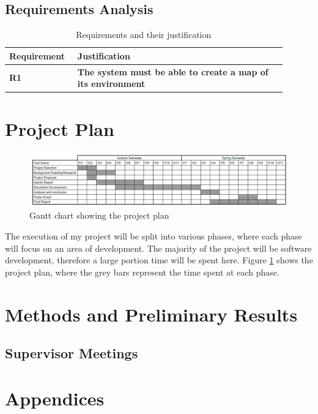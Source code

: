 \documentclass[12pt]{article}
\begin{document}
\subsection{Requirements Analysis}
\begin{table}[H]
    \centering
    \begin{tabular}{|p{0.2\linewidth}|p{0.7\linewidth}|}
        \hline
        \textbf{Requirement} & \textbf{Justification}\\
        \hline
        \textbf{R1} & \textbf{The system must be able to create a map of its environment}\\
        \hline
    \end{tabular}
    \caption{Requirements and their justification}\label{tab:table}
\end{table}


\section{Project Plan}
\begin{figure}[H]
    \centering
    \includegraphics[width=0.8\linewidth]{gantt_chart.png}
    \caption{Gantt chart showing the project plan}
    \label{fig:gantt_chart}
\end{figure}
The execution of my project will be split into various phases, where each phase will focus on an area of development. The
majority of the project will be software development, therefore a large portion time will be spent here. Figure
\ref{fig:gantt_chart} shows the project plan, where the grey bars represent the time spent at each phase.

\section{Methods and Preliminary Results}


\subsection{Supervisor Meetings}


\section{Appendices}
\end{document}
